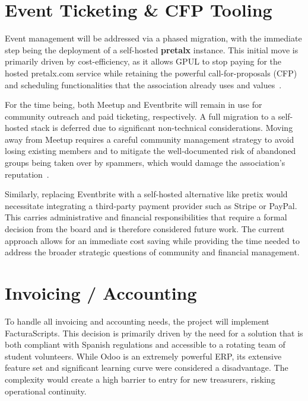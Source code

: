 \section{Event Ticketing \& CFP Tooling}

Event management will be addressed via a phased migration, with the immediate step being the deployment of a self-hosted \textbf{pretalx} instance. This initial move is primarily driven by cost-efficiency, as it allows GPUL to stop paying for the hosted pretalx.com service while retaining the powerful call-for-proposals (CFP) and scheduling functionalities that the association already uses and values~\cite{pretalx-docs}.

For the time being, both Meetup and Eventbrite will remain in use for community outreach and paid ticketing, respectively. A full migration to a self-hosted stack is deferred due to significant non-technical considerations. Moving away from Meetup requires a careful community management strategy to avoid losing existing members and to mitigate the well-documented risk of abandoned groups being taken over by spammers, which would damage the association's reputation~\cite{combuilders-meetup-takeover}.

Similarly, replacing Eventbrite with a self-hosted alternative like pretix would necessitate integrating a third-party payment provider such as Stripe or PayPal. This carries administrative and financial responsibilities that require a formal decision from the board and is therefore considered future work. The current approach allows for an immediate cost saving while providing the time needed to address the broader strategic questions of community and financial management.

\section{Invoicing / Accounting}

To handle all invoicing and accounting needs, the project will implement FacturaScripts. This decision is primarily driven by the need for a solution that is both compliant with Spanish regulations and accessible to a rotating team of student volunteers. While Odoo is an extremely powerful ERP, its extensive feature set and significant learning curve were considered a disadvantage. The complexity would create a high barrier to entry for new treasurers, risking operational continuity.

